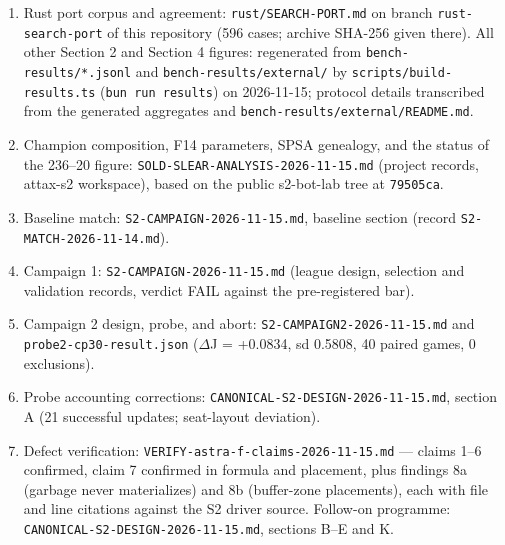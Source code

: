 \documentclass[
  11pt,
]{article}
\providecommand{\tightlist}{%
  \setlength{\itemsep}{0pt}\setlength{\parskip}{0pt}}
\begin{document}
\begin{enumerate}
\def\labelenumi{\arabic{enumi}.}
\tightlist
\item
  Rust port corpus and agreement: \texttt{rust/SEARCH-PORT.md} on branch
  \texttt{rust-search-port} of this repository (596 cases; archive
  SHA-256 given there). All other Section 2 and Section 4 figures:
  regenerated from \texttt{bench-results/*.jsonl} and
  \texttt{bench-results/external/} by \texttt{scripts/build-results.ts}
  (\texttt{bun\ run\ results}) on 2026-11-15; protocol details
  transcribed from the generated aggregates and
  \texttt{bench-results/external/README.md}.
\item
  Champion composition, F14 parameters, SPSA genealogy, and the status
  of the 236--20 figure: \texttt{SOLD-SLEAR-ANALYSIS-2026-11-15.md}
  (project records, attax-s2 workspace), based on the public s2-bot-lab
  tree at \texttt{79505ca}.
\item
  Baseline match: \texttt{S2-CAMPAIGN-2026-11-15.md}, baseline section
  (record \texttt{S2-MATCH-2026-11-14.md}).
\item
  Campaign 1: \texttt{S2-CAMPAIGN-2026-11-15.md} (league design,
  selection and validation records, verdict FAIL against the
  pre-registered bar).
\item
  Campaign 2 design, probe, and abort:
  \texttt{S2-CAMPAIGN2-2026-11-15.md} and
  \texttt{probe2-cp30-result.json} (\(\Delta\)J = +0.0834, sd 0.5808, 40 paired
  games, 0 exclusions).
\item
  Probe accounting corrections:
  \texttt{CANONICAL-S2-DESIGN-2026-11-15.md}, section A (21 successful
  updates; seat-layout deviation).
\item
  Defect verification: \texttt{VERIFY-astra-f-claims-2026-11-15.md} ---
  claims 1--6 confirmed, claim 7 confirmed in formula and placement,
  plus findings 8a (garbage never materializes) and 8b (buffer-zone
  placements), each with file and line citations against the S2 driver
  source. Follow-on programme:
  \texttt{CANONICAL-S2-DESIGN-2026-11-15.md}, sections B--E and K.
\end{enumerate}
\end{document}
